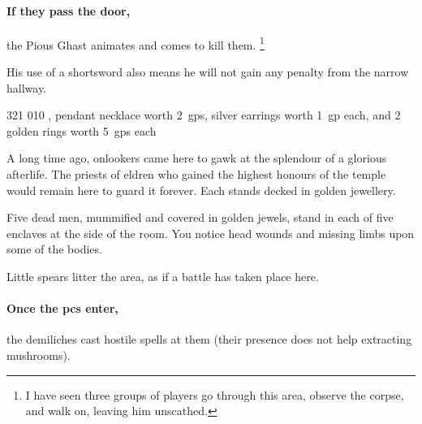 \begin{multicols}{2}
\paragraph{If they pass the door,}
the Pious Ghast animates and comes to kill them.%
\footnote{I have seen three groups of players go through this area, observe the corpse, and walk on, leaving him unscathed.}

His use of a shortsword also means he will not gain any penalty from the narrow hallway.

%
  {{3}{2}{1}}%
  {{0}{1}{0}}%
  {%
    \shortsword
    \completeplate
  }%
  {\stunningstrike, \adrenalinesurge}%
  {pendant necklace worth 2~\glspl{gp}, silver earrings worth 1~\gls{gp} each, and 2 golden rings worth 5~\glspl{gp} each}%
  {\undead}%


A long time ago, onlookers came here to gawk at the splendour of a glorious afterlife.
The priests of \gls{eldren} who gained the highest honours of the temple would remain here to guard it forever.
Each stands decked in golden jewellery.

\begin{boxtext}

  Five dead men, mummified and covered in golden jewels, stand in each of five enclaves at the side of the room.
  You notice head wounds and missing limbs upon some of the bodies.

  Little spears litter the area, as if a battle has taken place here.

\end{boxtext}




\paragraph{Once the \glspl{pc} enter,}
the demiliches cast hostile spells at them (their presence does not help extracting mushrooms).


\end{multicols}
